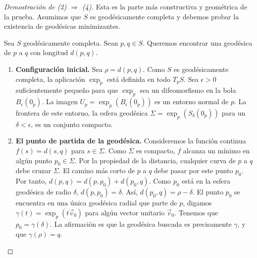 \documentclass[12pt, a4paper]{report}
\theoremstyle{miestilo}
\theoremstyle{midefinicion}
\begin{document}
\begin{proof}[Demostración de (2) $\Rightarrow$ (4)]

Esta es la parte más constructiva y geométrica de la prueba. Asumimos que $S$ es geodésicamente completa y debemos probar la existencia de geodésicas minimizantes.

Sea $S$ geodésicamente completa. Sean $p, q \in S$. Queremos encontrar una geodésica de $p$ a $q$ con longitud $d(p,q)$.

\begin{enumerate}
    \item \textbf{Configuración inicial.} Sea $\rho = d(p,q)$. Como $S$ es geodésicamente completa, la aplicación $\exp_p$ está definida en todo $T_pS$. Sea $\epsilon > 0$ suficientemente pequeño para que $\exp_p$ sea un difeomorfismo en la bola $B_\epsilon(0_p)$. La imagen $U_p = \exp_p(B_\epsilon(0_p))$ es un entorno normal de $p$. La frontera de este entorno, la esfera geodésica $\Sigma = \exp_p(S_\delta(0_p))$ para un $\delta < \epsilon$, es un conjunto compacto.

    \item \textbf{El punto de partida de la geodésica.} Consideremos la función continua $f(s) = d(s,q)$ para $s \in \Sigma$. Como $\Sigma$ es compacto, $f$ alcanza un mínimo en algún punto $p_0 \in \Sigma$. Por la propiedad de la distancia, cualquier curva de $p$ a $q$ debe cruzar $\Sigma$. El camino más corto de $p$ a $q$ debe pasar por este punto $p_0$. Por tanto, $d(p,q) = d(p,p_0) + d(p_0,q)$. Como $p_0$ está en la esfera geodésica de radio $\delta$, $d(p,p_0) = \delta$. Así, $d(p_0,q) = \rho - \delta$.
    El punto $p_0$ se encuentra en una única geodésica radial que parte de $p$, digamos $\gamma(t) = \exp_p(t\vec{v}_0)$ para algún vector unitario $\vec{v}_0$. Tenemos que $p_0 = \gamma(\delta)$. La afirmación es que la geodésica buscada es precisamente $\gamma$, y que $\gamma(\rho) = q$.


\end{enumerate}
\end{proof}
\end{document}
